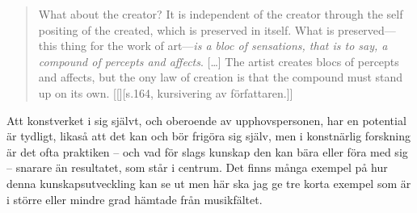 \documentclass[11pt]{article}
\begin{document}
\begin{quote}
What about the creator? It is independent of the creator through the
self positing of the created, which is preserved in itself. What is
preserved---this thing for the work of art---\emph{is a bloc of sensations,
that is to say, a compound of percepts and affects}. [\ldots{}] The artist
creates blocs of percepts and affects, but the ony law of creation is
that the compound must stand up on its own. [[][s.164,
kursivering av författaren.]]
\end{quote}

Att konstverket i sig självt, och oberoende av upphovspersonen, har en
potential är tydligt, likaså att det kan och bör frigöra sig själv, men
i konstnärlig forskning är det ofta praktiken -- och vad för slags
kunskap den kan bära eller föra med sig -- snarare än resultatet, som
står i centrum. Det finns många exempel på hur denna kunskapsutveckling
kan se ut men här ska jag ge tre korta exempel som är i större eller
mindre grad hämtade från musikfältet.
\end{document}
